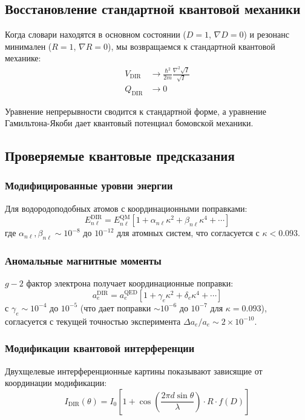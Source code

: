\documentclass[11pt,a4paper]{article}
\begin{document}
	\subsection{Восстановление стандартной квантовой механики}
	
	Когда словари находятся в основном состоянии ($D = 1$, $\nabla D = 0$) и резонанс минимален ($R = 1$, $\nabla R = 0$), мы возвращаемся к стандартной квантовой механике:
	\begin{align}
		V_{\text{DIR}} &\to \frac{\hbar^2}{2m} \frac{\nabla^2 \sqrt{I}}{\sqrt{I}} \\
		Q_{\text{DIR}} &\to 0
	\end{align}
	
	Уравнение непрерывности сводится к стандартной форме, а уравнение Гамильтона-Якоби дает квантовый потенциал бомовской механики.
	
	\subsection{Проверяемые квантовые предсказания}
	
	\subsubsection{Модифицированные уровни энергии}
	Для водородоподобных атомов с координационными поправками:
	\begin{equation}
		E_{n\ell}^{\text{DIR}} = E_{n\ell}^{\text{QM}} \left[ 1 + \alpha_{n\ell} \kappa^2 + \beta_{n\ell} \kappa^4 + \cdots \right]
	\end{equation}
	где $\alpha_{n\ell}, \beta_{n\ell} \sim 10^{-8}$ до $10^{-12}$ для атомных систем, что согласуется с $\kappa < 0.093$.
	
	\subsubsection{Аномальные магнитные моменты}
	$g-2$ фактор электрона получает координационные поправки:
	\begin{equation}
		a_e^{\text{DIR}} = a_e^{\text{QED}} \left[ 1 + \gamma_e \kappa^2 + \delta_e \kappa^4 + \cdots \right]
	\end{equation}
	с $\gamma_e \sim 10^{-4}$ до $10^{-5}$ (что дает поправки $\sim 10^{-6}$ до $10^{-7}$ для $\kappa=0.093$),
	согласуется с текущей точностью эксперимента $\Delta a_e/a_e \sim 2\times10^{-10}$.
	
	\subsubsection{Модификации квантовой интерференции}
	Двухщелевые интерференционные картины показывают зависящие от координации модификации:
	\begin{equation}
		I_{\text{DIR}}(\theta) = I_0 \left[ 1 + \cos\left( \frac{2\pi d \sin\theta}{\lambda} \right) \cdot R \cdot f(D) \right]
	\end{equation}
	
\end{document}

